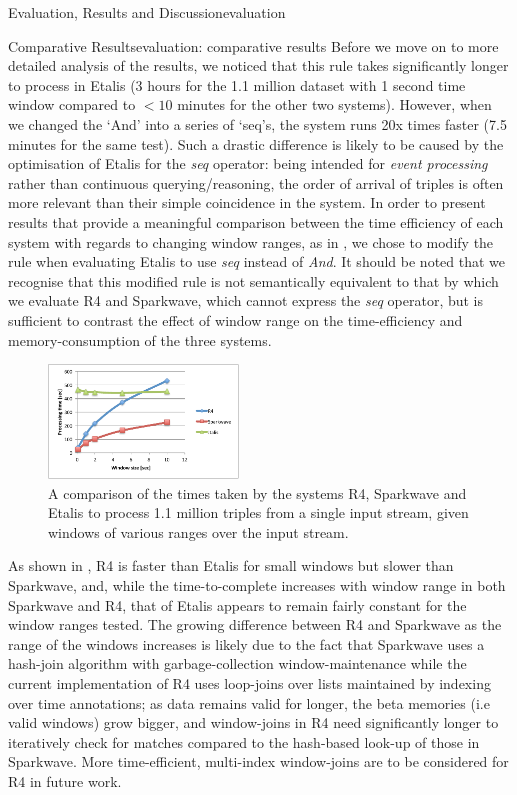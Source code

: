 \begin{nestedsection}{Evaluation, Results and Discussion}{evaluation}
\begin{nestedsection}{Comparative Results}{evaluation: comparative results}
		Before we move on to more detailed analysis of the results, we noticed that this rule takes significantly longer to process in Etalis (3 hours for the 1.1 million dataset with 1 second time window compared to ${<10}$ minutes for the other two systems).
		However, when we changed the `And' into a series of `seq's, the system runs 20x times faster (7.5 minutes for the same test).
		Such a drastic difference is likely to be caused by the optimisation of Etalis for the \emph{seq} operator: being intended for \emph{event processing} rather than continuous querying/reasoning, the order of arrival of triples is often more relevant than their simple coincidence in the system.
		In order to present results that provide a meaningful comparison between the time efficiency of each system with regards to changing window ranges, as in , we chose to modify the rule when evaluating Etalis to use \emph{seq} instead of \emph{And}.
		It should be noted that we recognise that this modified rule is not semantically equivalent to that by which we evaluate R4 and Sparkwave, which cannot express the \emph{seq} operator, but is sufficient to contrast the effect of window range on the time-efficiency and memory-consumption of the three systems.
		\begin{figure}
			\centering
			\includegraphics[width=0.45\textwidth]{all-systems-varying-windows}
			\caption{A comparison of the times taken by the systems R4, Sparkwave and Etalis to process 1.1 million triples from a single input stream, given windows of various ranges over the input stream.}
		\end{figure}

		As shown in , R4 is faster than Etalis for small windows but slower than Sparkwave, and, while the time-to-complete increases with window range in both Sparkwave and R4, that of Etalis appears to remain fairly constant for the window ranges tested.
		The growing difference between R4 and Sparkwave as the range of the windows increases is likely due to the fact that Sparkwave uses a hash-join algorithm with garbage-collection window-maintenance while the current implementation of R4 uses loop-joins over lists maintained by indexing over time annotations;
		as data remains valid for longer, the beta memories (i.e valid windows) grow bigger, and window-joins in R4 need significantly longer to iteratively check for matches compared to the hash-based look-up of those in Sparkwave.
		More time-efficient, multi-index window-joins are to be considered for R4 in future work.


\end{nestedsection}
\end{nestedsection}
